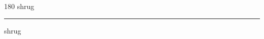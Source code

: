 
\begin{frame}
\begin{center}
\begin{turn}{180}
{\fontsize{2.5cm}{1em}\selectfont shrug}
\end{turn}
\vspace{1em}\par  
\hrule
\vspace{1em}\par  
{\fontsize{2.5cm}{1em}\selectfont shrug}
\end{center}
\end{frame}
